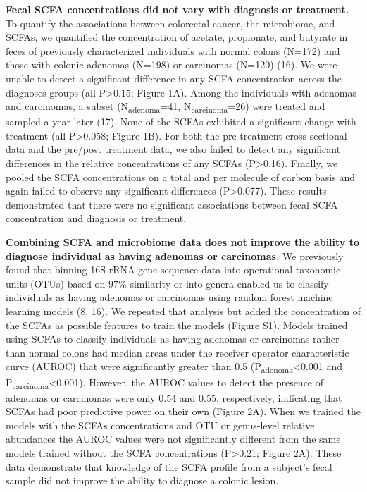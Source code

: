 \documentclass[11pt,]{article}
\begin{document}
\textbf{Fecal SCFA concentrations did not vary with diagnosis or
treatment.} To quantify the associations between colorectal cancer, the
microbiome, and SCFAs, we quantified the concentration of acetate,
propionate, and butyrate in feces of previously characterized
individuals with normal colons (N=172) and those with colonic adenomas
(N=198) or carcinomas (N=120) (16). We were unable to detect a
significant difference in any SCFA concentration across the diagnoses
groups (all P\textgreater{}0.15; Figure 1A). Among the individuals with
adenomas and carcinomas, a subset (N\textsubscript{adenoma}=41,
N\textsubscript{carcinoma}=26) were treated and sampled a year later
(17). None of the SCFAs exhibited a significant change with treatment
(all P\textgreater{}0.058; Figure 1B). For both the pre-treatment
cross-sectional data and the pre/post treatment data, we also failed to
detect any significant differences in the relative concentrations of any
SCFAs (P\textgreater{}0.16). Finally, we pooled the SCFA concentrations
on a total and per molecule of carbon basis and again failed to observe
any significant differences (P\textgreater{}0.077). These results
demonstrated that there were no significant associations between fecal
SCFA concentration and diagnosis or treatment.

\textbf{Combining SCFA and microbiome data does not improve the ability
to diagnose individual as having adenomas or carcinomas.} We previously
found that binning 16S rRNA gene sequence data into operational
taxonomic units (OTUs) based on 97\% similarity or into genera enabled
us to classify individuals as having adenomas or carcinomas using random
forest machine learning models (8, 16). We repeated that analysis but
added the concentration of the SCFAs as possible features to train the
models (Figure S1). Models trained using SCFAs to classify individuals
as having adenomas or carcinomas rather than normal colons had median
areas under the receiver operator characteristic curve (AUROC) that were
significantly greater than 0.5 (P\textsubscript{adenoma}\textless{}0.001
and P\textsubscript{carcinoma}\textless{}0.001). However, the AUROC
values to detect the presence of adenomas or carcinomas were only 0.54
and 0.55, respectively, indicating that SCFAs had poor predictive power
on their own (Figure 2A). When we trained the models with the SCFAs
concentrations and OTU or genus-level relative abundances the AUROC
values were not significantly different from the same models trained
without the SCFA concentrations (P\textgreater{}0.21; Figure 2A). These
data demonstrate that knowledge of the SCFA profile from a subject's
fecal sample did not improve the ability to diagnose a colonic lesion.
\end{document}
